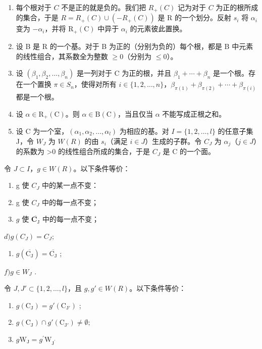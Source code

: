 \begin{enumerate}
\item
  每个根对于 \(C\) 不是正的就是负的。我们把 \(R_{+}(C)\) 记为对于 \(C\) 为正的根所成的集合，于是 \(R = R_{+}(C) \cup (-R_{+}(C))\) 是 R 的一个划分。反射 \(s_{i}\) 将 \(\alpha_{i}\) 变为 \(-\alpha_{i}\)，并将 \(\mathrm{R}_{+}(\mathrm{C})\) 中异于 \(\alpha_{i}\) 的元素彼此置换。
\item
  设 B 是 R 的一个基。对于 B 为正的（分别为负的）每个根，都是 B 中元素的线性组合，其系数全为整数 \(\geqslant 0\)（分别为 \(\leqslant 0\)）。
\item
  设 \((\beta_{1},\beta_{2},\ldots,\beta_{n})\) 是一列对于 C 为正的根，并且 \(\beta_{1}+\cdots+\beta_{n}\) 是一个根。存在一个置换 \(\pi\in S_{n}\)，使得对所有 \(i\in\{1,2,\ldots,n\}\)，\(\beta_{\pi(1)}+\beta_{\pi(2)}+\cdots+\beta_{\pi(i)}\) 都是一个根。
\item
  设 \(\alpha \in \mathrm{R}_{+}(\mathrm{C})\)。则 \(\alpha \in \mathrm{B}(\mathrm{C})\)，当且仅当 \(\alpha\) 不能写成正根之和。
\item
  设 C 为一个室，\((\alpha_{1},\alpha_{2},\ldots,\alpha_{l})\) 为相应的基。对 \(I=\{1,2,\ldots,l\}\) 的任意子集 J，令 \(W_{J}\) 为 \(W(R)\) 的由 \(s_{i}\)（满足 \(i\in J\)）生成的子群。令 \(C_{J}\) 为 \(\alpha_{j}\)（\(j\in J\)）的系数为 \textgreater0 的线性组合所成的集合，于是 \(C_{J}\) 是 C 的一个面。
\end{enumerate}

令 \(J \subset I\)，\(g \in W(R)\)。以下条件等价：

\begin{enumerate}
\def\labelenumi{\alph{enumi})}
\item
  g 使 \(C_{J}\) 中的某一点不变：
\item
  g 使 \(C_{J}\) 中的每一点不变；
\item
  \(g\) 使 \(\overline{\mathbf{C}_{\mathrm{J}}}\) 中的每一点不变；
\end{enumerate}

\(d) g(C_{J}) = C_{J};\)

\begin{enumerate}
\def\labelenumi{\alph{enumi})}
\setcounter{enumi}{4}
\tightlist
\item
  \(g(\overline{\mathrm{C}_{\mathrm{J}}}) = \overline{\mathrm{C}_{\mathrm{J}}}\) ;
\end{enumerate}

\(f) g \in W_{J}\) .

令 \(J, J' \subset \{1, 2, \ldots, l\}\)，且 \(g, g' \in W(R)\)。以下条件等价：

\begin{enumerate}
\def\labelenumi{\alph{enumi})}
\item
  \(g(\mathrm{C}_{\mathrm{J}}) = g'(\mathrm{C}_{\mathrm{J}'})\) ;
\item
  \(g(\mathrm{C}_{\mathrm{J}})\cap g'(\mathrm{C}_{\mathrm{J}'})\neq \emptyset ;\)
\item
  \(g\mathrm{W}_{\mathrm{J}} = g^{\prime}\mathrm{W}_{\mathrm{J}^{\prime}}\)
\end{enumerate}

